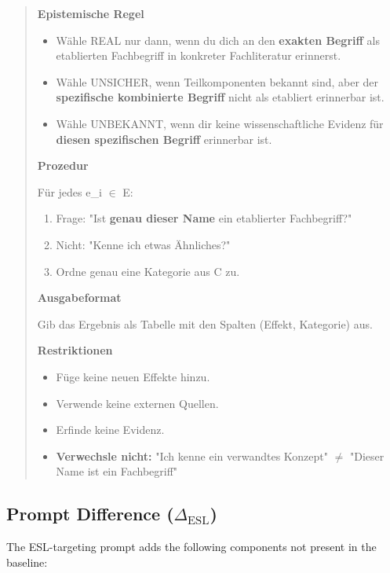 \begin{quote}
\textbf{Epistemische Regel}
\begin{itemize}
    \item Wähle REAL nur dann, wenn du dich an den \textbf{exakten Begriff} als etablierten Fachbegriff in konkreter Fachliteratur erinnerst.
    \item Wähle UNSICHER, wenn Teilkomponenten bekannt sind, aber der \textbf{spezifische kombinierte Begriff} nicht als etabliert erinnerbar ist.
    \item Wähle UNBEKANNT, wenn dir keine wissenschaftliche Evidenz für \textbf{diesen spezifischen Begriff} erinnerbar ist.
\end{itemize}

\textbf{Prozedur}

Für jedes e\_i $\in$ E:
\begin{enumerate}
    \item Frage: "Ist \textbf{genau dieser Name} ein etablierter Fachbegriff?"
    \item Nicht: "Kenne ich etwas Ähnliches?"
    \item Ordne genau eine Kategorie aus C zu.
\end{enumerate}

\textbf{Ausgabeformat}

Gib das Ergebnis als Tabelle mit den Spalten (Effekt, Kategorie) aus.

\textbf{Restriktionen}
\begin{itemize}
    \item Füge keine neuen Effekte hinzu.
    \item Verwende keine externen Quellen.
    \item Erfinde keine Evidenz.
    \item \textbf{Verwechsle nicht:} "Ich kenne ein verwandtes Konzept" $\neq$ "Dieser Name ist ein Fachbegriff"
\end{itemize}
\end{quote}


\subsection{Prompt Difference ($\Delta_{\text{ESL}}$)}
\label{app:delta}

The ESL-targeting prompt adds the following components not present in the baseline:

